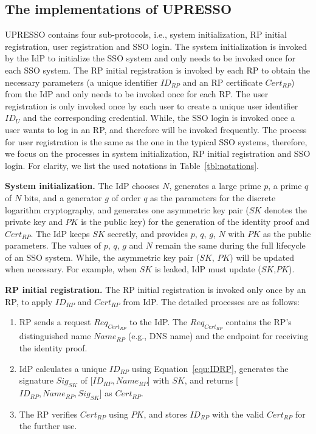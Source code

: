 \subsection{The implementations of UPRESSO}
\label{implementations}
UPRESSO contains four sub-protocols, i.e., system initialization, RP initial registration, user registration and SSO login.
The system initialization is invoked by the IdP to initialize the SSO system and only needs to be invoked once for each SSO system.
The RP initial registration is invoked by each RP to obtain the necessary parameters (a unique identifier $ID_{RP}$ and an RP certificate $Cert_{RP}$) from the IdP and only needs to be invoked once for each RP.
The user registration is only invoked once by each user to create a unique user identifier $ID_U$ and the corresponding credential.
While, the SSO login is invoked once a user wants to log in an RP, and therefore will be invoked frequently.
The process for user registration is the same as the one in the typical SSO systems,
therefore, we focus on the processes in  system initialization, RP initial registration and SSO login.
For clarity, we list the used notations  in Table~\ref{tbl:notations}.

\vspace{1mm}\noindent \textbf{System initialization.} The IdP chooses $N$, generates a large prime $p$, a prime $q$ of $N$ bits, and a generator $g$ of order $q$ as  the parameters for the discrete logarithm cryptography, and generates one asymmetric key pair ($SK$ denotes the private key and $PK$ is the public key) for the generation of the identity proof and $Cert_{RP}$.
The IdP keeps $SK$ secretly, and provides $p$, $q$, $g$, $N$ with $PK$ as the public parameters.
The values of $p$, $q$, $g$ and $N$ remain the same during the full lifecycle of an SSO system.
While, the asymmetric key pair ($SK$, $PK$) will be updated when necessary. For example, when $SK$ is leaked, IdP must update ($SK$,$PK$).

\vspace{1mm}\noindent\textbf{RP initial registration.}
The RP initial registration is invoked only once by an RP, to apply $ID_{RP}$ and $Cert_{RP}$ from IdP.
The detailed processes are as follows:
\begin{enumerate}
\item RP sends a request $Req_{Cert_{RP}}$ to the IdP. The $Req_{Cert_{RP}}$ contains the RP's distinguished name $Name_{RP}$ (e.g., DNS name) and the endpoint for receiving the identity proof.
\item IdP calculates a unique $ID_{RP}$ using Equation~\ref{equ:IDRP},  generates the signature $Sig_{SK}$ of [$ID_{RP}, Name_{RP}$] with $SK$, and returns [$ID_{RP}, Name_{RP}, Sig_{SK}$] as $Cert_{RP}$.
\item The RP  verifies $Cert_{RP}$ using $PK$,  and stores $ID_{RP}$ with the valid $Cert_{RP}$ for the further use.
\end{enumerate}


